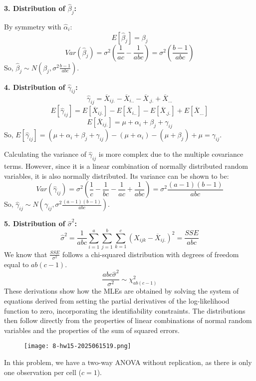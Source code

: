 \textbf{3. Distribution of $\widehat{\beta}_j$:}

By symmetry with $\widehat{\alpha}_i$:
\[
E[\widehat{\beta}_j] = \beta_j
\]
\[
Var(\widehat{\beta}_j) = \sigma^2 \left(\frac{1}{ac} - \frac{1}{abc}\right) = \sigma^2 \left(\frac{b-1}{abc}\right)
\]
So, $\widehat{\beta}_j \sim N\left(\beta_j, \sigma^2 \frac{b-1}{abc}\right)$.

\textbf{4. Distribution of $\widehat{\gamma}_{ij}$:}
\[
\widehat{\gamma}_{ij} = \overline{X}_{ij.} - \overline{X}_{i..} - \overline{X}_{.j.} + \overline{X}_{...}
\]
\[
E[\widehat{\gamma}_{ij}] = E[\overline{X}_{ij.}] - E[\overline{X}_{i..}] - E[\overline{X}_{.j.}] + E[\overline{X}_{...}]
\]
\[
E[\overline{X}_{ij.}] = \mu + \alpha_i + \beta_j + \gamma_{ij}
\]
So, $E[\widehat{\gamma}_{ij}] = (\mu + \alpha_i + \beta_j + \gamma_{ij}) - (\mu + \alpha_i) - (\mu + \beta_j) + \mu = \gamma_{ij}$.

Calculating the variance of $\widehat{\gamma}_{ij}$ is more complex due to the multiple covariance terms. However, since it is a linear combination of normally distributed random variables, it is also normally distributed. Its variance can be shown to be:
\[
Var(\widehat{\gamma}_{ij}) = \sigma^2 \left( \frac{1}{c} - \frac{1}{bc} - \frac{1}{ac} + \frac{1}{abc} \right) = \sigma^2 \frac{(a-1)(b-1)}{abc}
\]
So, $\widehat{\gamma}_{ij} \sim N\left(\gamma_{ij}, \sigma^2 \frac{(a-1)(b-1)}{abc}\right)$.

\textbf{5. Distribution of $\widehat{\sigma}^2$:}
\[
\widehat{\sigma}^2 = \frac{1}{abc} \sum_{i=1}^{a} \sum_{j=1}^{b} \sum_{k=1}^{c} (X_{ijk} - \overline{X}_{ij.})^2 = \frac{SSE}{abc}
\]
We know that $\frac{SSE}{\sigma^2}$ follows a chi-squared distribution with degrees of freedom equal to $ab(c-1)$.
\[
\frac{abc \widehat{\sigma}^2}{\sigma^2} \sim \chi^2_{ab(c-1)}
\]
These derivations show how the MLEs are obtained by solving the system of equations derived from setting the partial derivatives of the log-likelihood function to zero, incorporating the identifiability constraints. The distributions then follow directly from the properties of linear combinations of normal random variables and the properties of the sum of squared errors.

\begin{exercise}
\begin{figure}[H]
\centering
\texttt{[image: 8-hw15-2025061519.png]}
\label{}
\end{figure}
\end{exercise}
In this problem, we have a two-way ANOVA without replication, as there is only one observation per cell ($c=1$).

